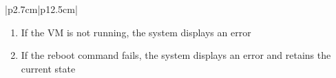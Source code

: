 \begin{table}[H]
\begin{tabular}{|p{2.7cm}|p{12.5cm}|}
\begin{minipage}[t]{\linewidth}
\begin{enumerate}[topsep=0pt,itemsep=1pt,parsep=0pt,partopsep=0pt]
                                          \item If the VM is not running, the system displays an error
                                          \item If the reboot command fails, the system displays an error and retains the
                                                current state
                                      \end{enumerate}
                                  \end{minipage} \\
        \hline
    \end{tabular}
    \label{tab:admin-reboot-vm}
\end{table}

